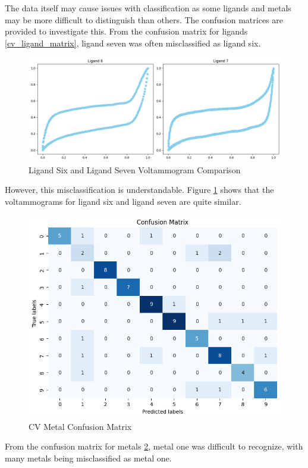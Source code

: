 The data itself may cause issues with classification as some ligands and metals may be more difficult to distinguish than others. The confusion matrices are provided to investigate this.
From the confusion matrix for ligands \ref{cv_ligand_matrix}, ligand seven was often misclassified as ligand six.
\begin{figure}[h!]
  \centering
    \includegraphics[width=1.0\textwidth]{figures/ligand_comparison.png}
    \caption{Ligand Six and Ligand Seven Voltammogram Comparison}
    \label{ligand_comparison}
\end{figure}
However, this misclassification is understandable. Figure \ref{ligand_comparison} shows that the voltammograms for ligand six and ligand seven are quite similar. 
\begin{figure}[h!]
  \centering
    \includegraphics[width=1.0\textwidth]{figures/cv_metal_matrix.png}
    \caption{CV Metal Confusion Matrix}
    \label{cv_metal_matrix}
\end{figure}
From the confusion matrix for metals \ref{cv_metal_matrix}, metal one was difficult to recognize, with many metals being misclassified as metal one. 
